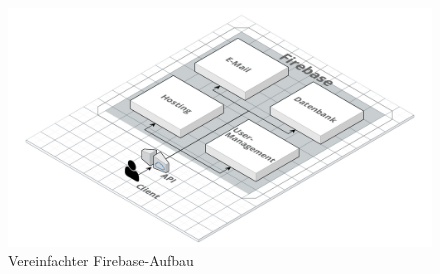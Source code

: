 \begin{figure}[h]
    \centering
    \includegraphics[width=.9\textwidth]{img/Firebase.png}
    \caption{Vereinfachter Firebase-Aufbau}
    \label{fig:firebaseAufbau}
\end{figure}


